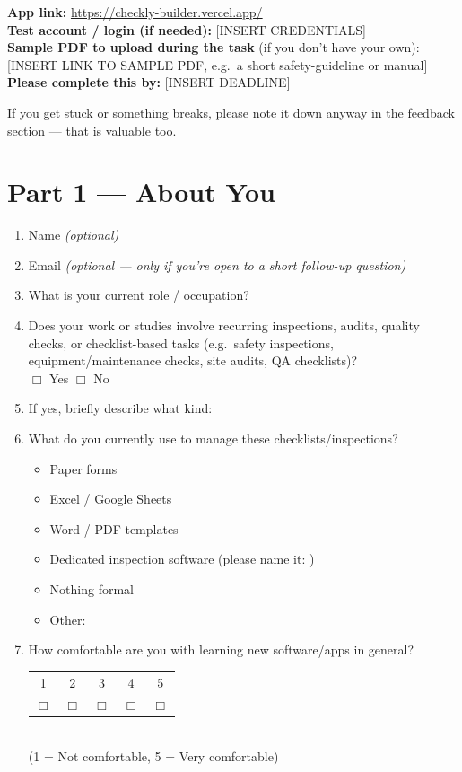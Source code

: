 \documentclass[11pt,a4paper]{article}
\newcommand{\fillline}[1]{\makebox[#1][l]{\hrulefill}}
\begin{document}
\textbf{App link:} \url{https://checkly-builder.vercel.app/}\\
\textbf{Test account / login (if needed):} [INSERT CREDENTIALS]\\
\textbf{Sample PDF to upload during the task} (if you don't have your own): [INSERT LINK TO SAMPLE PDF, e.g.\ a short safety-guideline or manual]\\
\textbf{Please complete this by:} [INSERT DEADLINE]

If you get stuck or something breaks, please note it down anyway in the feedback section --- that is valuable too.

\section*{Part 1 --- About You}

\begin{enumerate}
  \item Name \textit{(optional)} \fillline{6cm}
  \item Email \textit{(optional --- only if you're open to a short follow-up question)}\\
  \fillline{6cm}
  \item What is your current role / occupation? \fillline{6cm}
  \item Does your work or studies involve recurring inspections, audits, quality checks, or checklist-based tasks (e.g.\ safety inspections, equipment/maintenance checks, site audits, QA checklists)?\\
  $\Box$ Yes \qquad $\Box$ No
  \item If yes, briefly describe what kind: \fillline{8cm}
  \item What do you currently use to manage these checklists/inspections?
  \begin{itemize}[label=$\Box$]
    \item Paper forms
    \item Excel / Google Sheets
    \item Word / PDF templates
    \item Dedicated inspection software (please name it: \fillline{4cm})
    \item Nothing formal
    \item Other: \fillline{5cm}
  \end{itemize}
  \item How comfortable are you with learning new software/apps in general?
  \begin{center}
  \begin{tabular}{*{5}{c}}
  1 & 2 & 3 & 4 & 5\\
  $\Box$ & $\Box$ & $\Box$ & $\Box$ & $\Box$\\
  \end{tabular}\\[0.2em]
  {\small (1 = Not comfortable, 5 = Very comfortable)}
  \end{center}
\end{enumerate}
\end{document}
